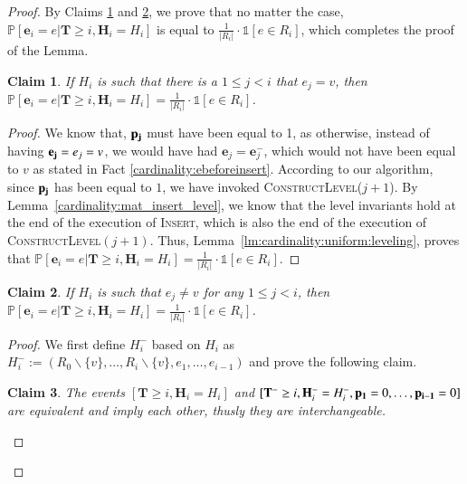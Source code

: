 \documentclass[11pt]{article}
\newtheorem{claim}{Claim}[section]
\renewcommand{\Pr}[1]{\ensuremath{\mathbb{P}\left[#1\right]}}
\newcommand{\ind}[1]{\ensuremath{\mathds{1}\left[#1\right]}}
\newcommand{\constLevel}{\textsc{ConstructLevel}}
\newcommand{\insertv}{{\textsc{Insert}}}
\newcommand{\bE}{\ensuremath{\mathbf{e}}}
\newcommand{\bT}{\ensuremath{\mathbf{T}}}
\newcommand{\bH}{\ensuremath{\mathbf{H}}}
\begin{document}
\begin{proof}
By Claims \ref{cardinality:insertcase1} and \ref{cardinality:insertcase2}, we prove that no matter the case, $\Pr{\bE_i = e | \bT \geq i, \bH_i = H_i}$ is equal to $\frac{1}{|R_i|} \cdot \ind{e \in R_i}$, which completes the proof of the Lemma.

\begin{claim}
\label{cardinality:insertcase1}
If $H_i$ is such that there is a $1 \le j < i$ that $e_j = v$, then  
$\Pr{\bE_i = e | \bT \geq i, \bH_i = H_i} = \frac{1}{|R_i|} \cdot \ind{e \in R_i}$.
\end{claim}

\begin{proof}
We know that, $\bold{p_j}$ 
must have been equal to 1, as otherwise, instead of having $\bold{e_j} = e_j = v$, we would have had $\bE_j = \bE_j^-$, which would not have been equal to $v$ as stated in Fact \ref{cardinality:ebeforeinsert}. According to our algorithm, since $\bold{p_j}$ has been equal to $1$, we have invoked \constLevel($j + 1$). 
By Lemma~\ref{cardinality:mat_insert_level}, we know that the level invariants hold at the end of the execution of \insertv{}, which is also the end of the execution of \constLevel{$(j + 1)$}. 
Thus, Lemma~\ref{lm:cardinality:uniform:leveling}, proves that $\Pr{\bE_i = e | \bT \geq i, \bH_i = H_i} = \frac{1}{|R_i|}\cdot \ind{e \in R_i}$.
\end{proof}

\begin{claim}
\label{cardinality:insertcase2}
If $H_i$ is such that $e_j \neq v$ for any $1 \le j < i$, then  
$\Pr{\bE_i = e | \bT \geq i, \bH_i = H_i} = \frac{1}{|R_i|} \cdot \ind{e \in R_i}$.
\end{claim}

\begin{proof}
We first define $H_i^-$ based on $H_i$ as $ H_i^- := 
    (R_0 \backslash \{v\} , \dots, R_i \backslash \{v\}, e_1, \dots, e_{i-1})$ 
and prove the following claim. 
\begin{claim}
\label{cardinality:insertclaim}
The events $[\bT \geq i, \bH_i = H_i]$ and $[\bT^- \geq i, \bH_i^- = H_i^-, \bold{p_1} = 0, \dots, \bold{p_{i - 1}} = 0]$ are equivalent and imply each other, thusly they are interchangeable.   
\end{claim}


\end{proof}
\end{proof}
\end{document}
